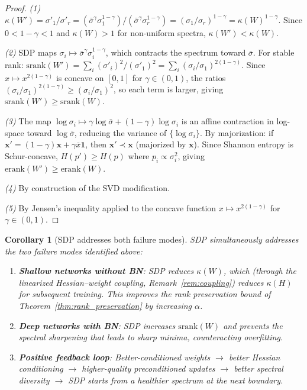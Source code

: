 \documentclass{article}
\newtheorem{corollary}[theorem]{Corollary}
\newcommand{\erank}{\mathrm{erank}}
\begin{document}
\begin{proof}
\emph{(1)} $\kappa(W') = \sigma'_1/\sigma'_r = (\bar\sigma^\gamma \sigma_1^{1-\gamma})/(\bar\sigma^\gamma \sigma_r^{1-\gamma}) = (\sigma_1/\sigma_r)^{1-\gamma} = \kappa(W)^{1-\gamma}.$ Since $0 < 1-\gamma < 1$ and $\kappa(W) > 1$ for non-uniform spectra, $\kappa(W') < \kappa(W)$.

\emph{(2)} SDP maps $\sigma_i \mapsto \bar\sigma^\gamma \sigma_i^{1-\gamma}$, which contracts the spectrum toward $\bar\sigma$. For stable rank: $\mathrm{srank}(W') = \sum_i (\sigma'_i)^2 / (\sigma'_1)^2 = \sum_i (\sigma_i/\sigma_1)^{2(1-\gamma)}$. Since $x \mapsto x^{2(1-\gamma)}$ is concave on $[0,1]$ for $\gamma \in (0,1)$, the ratios $(\sigma_i/\sigma_1)^{2(1-\gamma)} \geq (\sigma_i/\sigma_1)^2$, so each term is larger, giving $\mathrm{srank}(W') \geq \mathrm{srank}(W)$.

\emph{(3)} The map $\log\sigma_i \mapsto \gamma\log\bar\sigma + (1-\gamma)\log\sigma_i$ is an affine contraction in log-space toward $\log\bar\sigma$, reducing the variance of $\{\log\sigma_i\}$. By majorization: if $\bm{x}' = (1-\gamma)\bm{x} + \gamma\bar{x}\bm{1}$, then $\bm{x}' \prec \bm{x}$ (majorized by $\bm{x}$). Since Shannon entropy is Schur-concave, $H(p') \geq H(p)$ where $p_i \propto \sigma_i^2$, giving $\erank(W') \geq \erank(W)$.

\emph{(4)} By construction of the SVD modification.

\emph{(5)} By Jensen's inequality applied to the concave function $x \mapsto x^{2(1-\gamma)}$ for $\gamma \in (0,1)$.
\end{proof}

\begin{corollary}[SDP addresses both failure modes]
\label{cor:synergy}
SDP simultaneously addresses the two failure modes identified above:
\begin{enumerate}[nosep]
    \item \textbf{Shallow networks without BN}: SDP reduces $\kappa(W)$, which (through the linearized Hessian--weight coupling, Remark~\ref{rem:coupling}) reduces $\kappa(H)$ for subsequent training. This improves the rank preservation bound of Theorem~\ref{thm:rank_preservation} by increasing $\alpha$.
    \item \textbf{Deep networks with BN}: SDP increases $\mathrm{srank}(W)$ and prevents the spectral sharpening that leads to sharp minima, counteracting overfitting.
    \item \textbf{Positive feedback loop}: Better-conditioned weights $\to$ better Hessian conditioning $\to$ higher-quality preconditioned updates $\to$ better spectral diversity $\to$ SDP starts from a healthier spectrum at the next boundary.
\end{enumerate}
\end{corollary}
\end{document}
